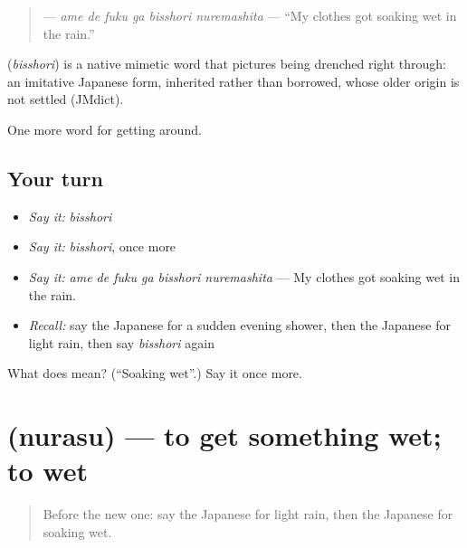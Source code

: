 \begin{quote}
\textbf{   } — \emph{ame de fuku ga bisshori nuremashita} — \textquotedblleft{}My clothes got soaking wet in the rain.\textquotedblright{}
\end{quote}

\begin{cousinweb}
\textbf{} (\emph{bisshori}) is a native mimetic word that pictures being drenched right through: an imitative Japanese form, inherited rather than borrowed, whose older origin is not settled (JMdict).
\end{cousinweb}

\begin{grammarlens}[title={What you've built}]
One more word for getting around.
\end{grammarlens}

\subsection*{Your turn}
\begin{itemize}
\raggedright
  \item \emph{Say it:} \emph{bisshori}
  \item \emph{Say it:} \emph{bisshori}, once more
  \item \emph{Say it:} \emph{ame de fuku ga bisshori nuremashita} — My clothes got soaking wet in the rain.
  \item \emph{Recall:} say the Japanese for a sudden evening shower, then the Japanese for light rain, then say \emph{bisshori} again
\end{itemize}

\begin{tcolorbox}[breakable,colback=teal!4,colframe=teal!35!black,title={Before you move on}]
What does  mean? (\textquotedblleft{}Soaking wet\textquotedblright{}.) Say it once more.
\end{tcolorbox}
\section[\texorpdfstring{\ja{ぬらす} (nurasu)}{ぬらす (nurasu)}]{ (nurasu) — to get something wet; to wet}

\label{lesson:JA-C415-nurasu}



\begin{quote}
Before the new one: say the Japanese for light rain, then the Japanese for soaking wet.
\end{quote}

